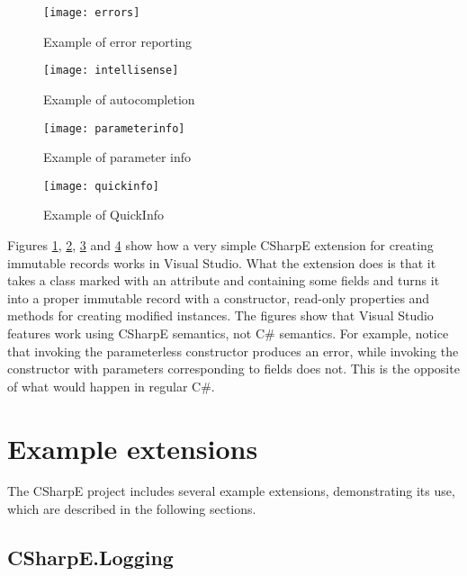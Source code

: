 \medskip

\begin{figure}[p]
\centering
\texttt{[image: errors]}
\caption{Example of error reporting}
\label{figure-errors}
\end{figure}

\begin{figure}[p]
\centering
\texttt{[image: intellisense]}
\caption{Example of autocompletion}
\label{figure-intellisense}
\end{figure}

\begin{figure}[p]
\centering
\texttt{[image: parameterinfo]}
\caption{Example of parameter info}
\label{figure-parameterinfo}
\end{figure}

\begin{figure}[p]
\centering
\texttt{[image: quickinfo]}
\caption{Example of QuickInfo}
\label{figure-quickinfo}
\end{figure}

Figures \ref{figure-errors}, \ref{figure-intellisense}, \ref{figure-parameterinfo} and \ref{figure-quickinfo} show how a very simple CSharpE extension for creating immutable records works in Visual Studio. What the extension does is that it takes a class marked with an attribute and containing some fields and turns it into a proper immutable record with a constructor, read-only properties and  methods for creating modified instances. The figures show that Visual Studio features work using CSharpE semantics, not C\# semantics. For example, notice that invoking the parameterless constructor produces an error, while invoking the constructor with parameters corresponding to fields does not. This is the opposite of what would happen in regular C\#.

\medskip


\section{Example extensions}
\label{example-extensions}

The CSharpE project includes several example extensions, demonstrating its use, which are described in the following sections.

\subsection{CSharpE.Logging}

